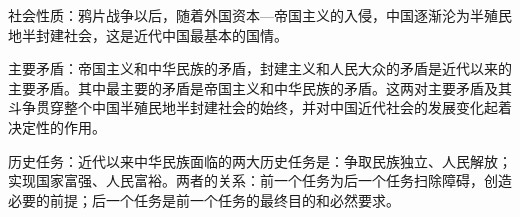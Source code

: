 {社会性质}{：鸦片战争以后，随着外国资本---帝国主义的入侵，中国逐渐沦为}{半殖民地半封建社会}{，这是}{近代中国最基本的国情}{。}{}

{主要矛盾}{：}{帝国主义和中华民族的矛盾，封建主义和人民大众的矛盾是近代以来的主要矛盾。其中最主要的矛盾是帝国主义和中华民族的矛盾}{。这两对主要矛盾及其斗争贯穿整个中国半殖民地半封建社会的始终，并对中国近代社会的发展变化起着决定性的作用。~}{}

{历史任务}{：近代以来中华民族面临的两大历史任务是：}{争取民族独立、人民解放}{；}{实现国家富强、人民富裕}{。两者的关系：前一个任务为后一个任务扫除障碍，创造必要的前提；后一个任务是前一个任务的最终目的和必然要求。}
